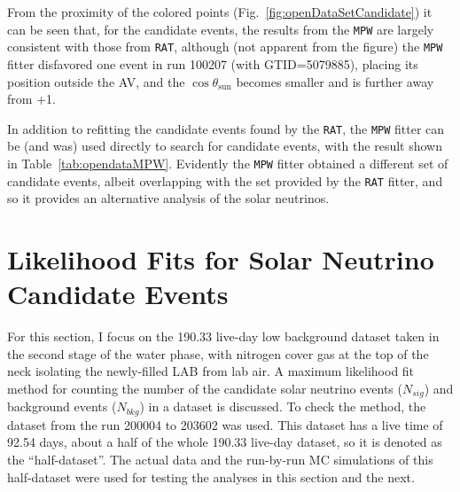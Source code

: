 From the proximity of the colored points (Fig.~\ref{fig:openDataSetCandidate}) it can be seen that, for the candidate events, the results from the \texttt{MPW} are largely consistent with those from \texttt{RAT}, although (not apparent from the figure) the \texttt{MPW} fitter disfavored one event in run 100207 (with GTID=5079885), placing its position outside the AV, and the $\cos\theta_\mathrm{sun}$ becomes smaller and is further away from +1. %

In addition to refitting the candidate events found by the \texttt{RAT}, the \texttt{MPW} fitter can be (and was) used directly to search for candidate events, with the result shown in Table~\ref{tab:opendataMPW}. Evidently the \texttt{MPW} fitter obtained a different set of candidate events, albeit overlapping with the set provided by the \texttt{RAT} fitter, and so it provides an alternative analysis of the solar neutrinos.

\section{Likelihood Fits for Solar Neutrino Candidate Events}

For this section, I focus on the 190.33 live-day low background dataset taken in the second stage of the water phase, with nitrogen cover gas at the top of the neck isolating the newly-filled LAB from lab air. A maximum likelihood fit method for counting the number of the candidate solar neutrino events ($N_{sig}$) and background events ($N_{bkg}$) in a dataset is discussed. To check the method, the dataset from the run 200004 to 203602 was used. This dataset has a live time of 92.54 days, about a half of the whole 190.33 live-day dataset, so it is denoted as the ``half-dataset''. The actual data and the run-by-run MC simulations of this half-dataset were used for testing the analyses in this section and the next.

